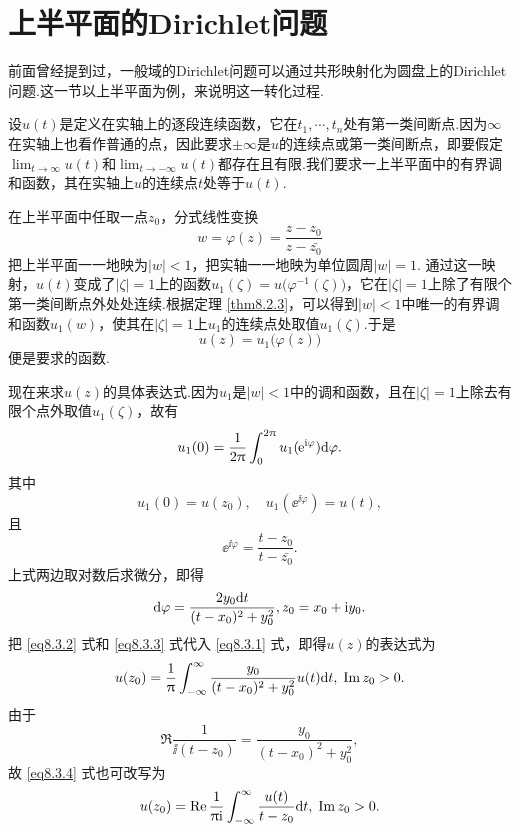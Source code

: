 \section{上半平面的Dirichlet问题\label{sec8.3}}
前面曾经提到过，一般域的Dirichlet问题可以通过共形映射化为圆盘上的Dirichlet问题.这一节以上半平面为例，来说明这一转化过程.

设$u(t)$是定义在实轴上的逐段连续函数，它在$t_1,\cdots,t_n$处有第一类间断点.因为$\infty$在实轴上也看作普通的点，因此要求$\pm\infty$是$u$的连续点或第一类间断点，即要假定$\lim_{t\to\infty}u(t)$和$\lim_{t\to-\infty}u(t)$都存在且有限.我们要求一上半平面中的有界调和函数，其在实轴上$u$的连续点$t$处等于$u(t)$.

在上半平面中任取一点$z_0$，分式线性变换
\[w=\varphi(z)=\frac{z-z_0}{z-\bar{z_0}}\]
把上半平面一一地映为$|w|<1$，把实轴一一地映为单位圆周$|w|=1$. 通过这一映射，$u(t)$变成了$|\zeta|=1$上的函数$u_1(\zeta)=u\big(\varphi^{-1}(\zeta)\big)$，它在$|\zeta|=1$上除了有限个第一类间断点外处处连续.根据定理 \ref{thm8.2.3}，可以得到$|w|<1$中唯一的有界调和函数$u_1(w)$，使其在$|\zeta|=1$上$u_1$的连续点处取值$u_1(\zeta)$.于是
\[u(z)=u_1\big(\varphi(z)\big)\]
便是要求的函数.

现在来求$u(z)$的具体表达式.因为$u_1$是$|w|<1$中的调和函数，且在$|\zeta|=1$上除去有限个点外取值$u_1(\zeta)$，故有
\begin{equation}\label{eq8.3.1}
u_1(0)=\frac1{2\pi}\int_0^{2\pi}u_1(\ee^{\ii\varphi})\textrm d\varphi.
\end{equation}
其中
\begin{equation}\label{eq8.3.2}
u_1(0)=u(z_0),\quad u_1(\ee^{\ii\varphi})=u(t),
\end{equation}
且
\[\ee^{\ii\varphi}=\frac{t-z_0}{t-\bar{z_0}}.\]
上式两边取对数后求微分，即得
\begin{equation}\label{eq8.3.3}
\textrm d\varphi=\frac{2y_0\textrm dt}{(t-x_0)^2+y_0^2},z_0=x_0+\ii y_0.
\end{equation}
把 \eqref{eq8.3.2} 式和 \eqref{eq8.3.3} 式代入 \eqref{eq8.3.1} 式，即得$u(z)$的表达式为
\begin{equation}\label{eq8.3.4}
u(z_0)=\frac1\pi\int_{-\infty}^\infty\frac{y_0}{(t-x_0)^2+y_0^2}u(t)\textrm dt,\;\Im z_0>0.
\end{equation}
由于
\[\Re\frac1{\ii(t-z_0)}=\frac{y_0}{(t-x_0)^2+y_0^2},\]
故 \eqref{eq8.3.4} 式也可改写为
\begin{equation}\label{eq8.3.5}
u(z_0)=\Re\frac1{\pi\ii}\int_{-\infty}^\infty\frac{u(t)}{t-z_0}\textrm dt,\;\Im z_0>0.
\end{equation}

